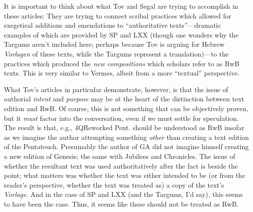 It is important to think about what Tov and Segal are trying to
accomplish in these articles: They are trying to connect scribal
practices which allowed for exegetical additions and emendations to
``authoritative texts''---dramatic examples of which are provided by SP
and LXX (though one wonders why the Targums aren't included here;
perhaps because Tov is arguing for Hebrew \emph{Vorlagen} of these
texts, while the Targums represent a translation)---to the practices
which produced the \emph{new compositions} which scholars refer to as
RwB texts. This is very similar to Vermes, albeit from a more
``textual'' perspective.

What Tov's articles in particular demonstrate, however, is that the
issue of authorial \emph{intent} and \emph{purpose} may be at the heart
of the distinction between text edition and RwB. Of course, this is not
something that can be objectively proven, but it \emph{must} factor into
the conversation, even if we must settle for speculation. The result is
that, e.g., 4QReworked Pent. should be understood as RwB insofar as we
imagine the author attempting something \emph{other} than creating a
text edition of the Pentateuch. Presumably the author of GA did not
imagine himself creating a new edition of Genesis; the same with
Jubilees and Chronicles. The issue of whether the resultant text was
used authoritatively after the fact is beside the point; what matters
was whether the text was either intended to be (or from the reader's
perspective, whether the text was treated as) a copy of the text's
\emph{Vorlage}. And in the case of SP and LXX (and the Targums, I'd
say), this seems to have been the case. Thus, it seems like these should
not be treated as RwB.
